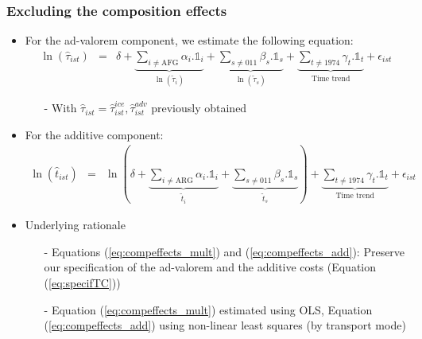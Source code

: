 \documentclass[10 pt,Helvetica, french]{beamer}
\begin{document}
\begin{frame}
\frametitle{Excluding the composition effects}
\begin{itemize}
\item For the ad-valorem component, we estimate the following equation:
\footnotesize
\begin{eqnarray}
\ln(\widehat{\tau}_{ist})&=&\delta +\underbrace{\sum_{i \neq \text{AFG}}\alpha_i.\mathbb{1}_i }_{\ln(\widetilde{\tau}_i)}+ \underbrace{\sum_{s\neq \text{011}}\beta_s.\mathbb{1}_s }_{\ln(\widetilde{\tau}_s)}+ \underbrace{\sum_{t \neq 1974}\gamma_t.\mathbb{1}_t}_{\text{Time trend}}+\epsilon_{ist} \label{eq:compeffects_mult}
\end{eqnarray}
\normalsize
\begin{itemize}
\item[-] With $\widehat{\tau}_{ist} = \widehat{\tau}^{ice}_{ist}, \widehat{\tau}^{adv}_{ist}$ previously obtained  \vspace{0.1cm}
\end{itemize}
\item For the additive component:
\footnotesize
\begin{eqnarray}
\ln(\widehat{t}_{ist})&=&\ln\left(\delta +  \underbrace{\sum_{i \neq \text{ARG}}  \alpha_i.\mathbb{1}_i}_{\widetilde{t}_i}+ \underbrace{\sum_{s \neq \text{011}}\beta_s.\mathbb{1}_s}_{\widetilde{t}_s}\right) + \underbrace{\sum_{t \neq 1974}\gamma_t.\mathbb{1}_t}_{\text{Time trend}}+\epsilon_{ist} \label{eq:compeffects_add}
\end{eqnarray}
\normalsize
\item Underlying rationale
\footnotesize
\begin{itemize}
\item[-] Equations (\ref{eq:compeffects_mult}) and (\ref{eq:compeffects_add}): Preserve our specification of the ad-valorem and the additive costs (Equation (\ref{eq:specifTC})) \vspace{0.1cm}
\item[-] Equation (\ref{eq:compeffects_mult}) estimated using OLS, Equation (\ref{eq:compeffects_add}) using non-linear least squares (by transport mode)
    \normalsize
\end{itemize}
\end{itemize}
\end{frame}
\end{document}
